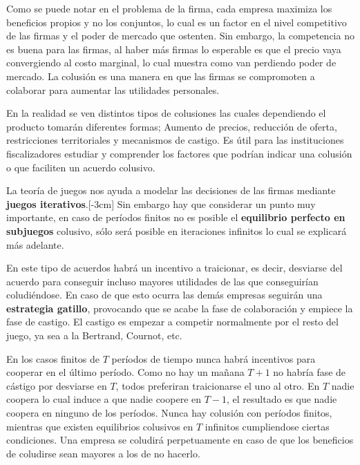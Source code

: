 Como se puede notar en el problema de la firma, cada empresa maximiza los beneficios propios y no los conjuntos, lo cual es un factor en el nivel competitivo de las firmas y el poder de mercado que ostenten. Sin embargo, la competencia no es buena para las firmas, al haber más firmas lo esperable es que el precio vaya convergiendo al costo marginal, lo cual muestra como van perdiendo poder de mercado. La colusión es una manera en que las firmas se compromoten a colaborar para aumentar las utilidades personales. 

En la realidad se ven distintos tipos de colusiones las cuales dependiendo el producto tomarán diferentes formas; Aumento de precios, reducción de oferta, restricciones territoriales y mecanismos de castigo. Es útil para las instituciones fiscalizadores estudiar y comprender los factores que podrían indicar una colusión o que faciliten un acuerdo colusivo. 

La teoría de juegos nos ayuda a modelar las decisiones de las firmas mediante \textbf{juegos iterativos}.[-3cm] Sin embargo hay que considerar un punto muy importante, en caso de períodos finitos no es posible el \textbf{equilibrio perfecto en subjuegos} colusivo, sólo será posible en iteraciones infinitos lo cual se explicará más adelante.

En este tipo de acuerdos habrá un incentivo a traicionar, es decir, desviarse del acuerdo para conseguir incluso mayores utilidades de las que conseguirían coludiéndose. En caso de que esto ocurra las demás empresas seguirán una \textbf{estrategia gatillo}, provocando que se acabe la fase de colaboración y empiece la fase de castigo. El castigo es empezar a competir normalmente por el resto del juego, ya sea a la Bertrand, Cournot, etc.

En los casos finitos de $T$ períodos de tiempo nunca habrá incentivos para cooperar en el último período. Como no hay un mañana $T+1$ no habría fase de cástigo por desviarse en $T$, todos preferiran traicionarse el uno al otro. En $T$ nadie coopera lo cual induce a que nadie coopere en $T-1$, el resultado es que nadie coopera en ninguno de los períodos. Nunca hay colusión con períodos finitos, mientras que existen equilibrios colusivos en $T$ infinitos cumpliendose ciertas condiciones. Una empresa se coludirá perpetuamente en caso de que los beneficios de coludirse sean mayores a los de no hacerlo. 

